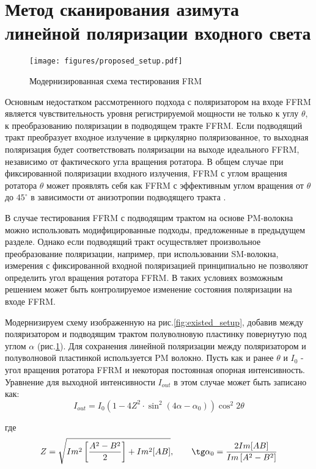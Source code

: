 \documentclass{article}
\begin{document}
\section{Метод сканирования азимута линейной поляризации входного света}
\begin{figure}[b]
	\centering
	\texttt{[image: figures/proposed\_setup.pdf]}
	\caption{Модернизированная схема тестирования FRM}
	\label{fig:proposed_setup}
\end{figure} 
Основным недостатком рассмотренного подхода с поляризатором на входе FFRM является чувствительность уровня регистрируемой мощности не только к углу $\theta$, к преобразованию поляризации в подводящем тракте FFRM.
Если подводящий тракт преобразует входное излучение в циркулярно поляризованное, то  выходная поляризация будет соответствовать поляризации на выходе идеального FFRM, независимо от фактического угла вращения ротатора.
В общем случае при фиксированной поляризации входного излучения, FFRM с углом вращения ротатора $\theta$ может проявлять себя как FFRM с эффективным углом вращения от $\theta$ до $45^\circ$ в зависимости от анизотропии подводящего тракта \autocite{buchilkoAnalysisStatePolarization2024}.

В случае тестирования FFRM с подводящим трактом на основе PM-волокна можно использовать модифицированные подходы, предложенные в предыдущем разделе.
Однако если подводящий тракт осуществляет произвольное преобразование поляризации, например, при использовании SM-волокна, измерения с фиксированной входной поляризацией принципиально не позволяют определить угол вращения ротатора FFRM.
В таких условиях возможным решением может быть контролируемое изменение состояния поляризации на входе FFRM.

Модернизируем схему изображенную на рис.\ref{fig:existed_setup}, добавив  между поляризатором и подводящим трактом полуволновую пластинку повернутую под углом $\alpha$ (рис.\ref{fig:proposed_setup}).
Для сохранения линейной поляризации между поляризатором и полуволновой пластинкой используется PM волокно.
Пусть как и ранее $\theta$ и $I_0$ -  угол вращения ротатора FFRM и некоторая постоянная опорная интенсивность.
Уравнение для выходной интенсивности $I_{out}$ в этом случае  может быть записано как:
\begin{equation}
	\label{eq:Iout_our}
	I_{out} =  I_0 \left( 1 - 4 Z^2 \cdot \sin^2(4\alpha - \alpha_0)\right)  \cos^2 2 \theta
\end{equation}

где
\begin{equation}
	Z = \sqrt{Im^2\left[\frac{A^2-B^2}{2}\right]+Im^2[AB]}, \qquad  \tg\alpha_0 = \frac{2Im[AB]}{Im\left[A^2 - B^2\right]}
\end{equation}
\end{document}
